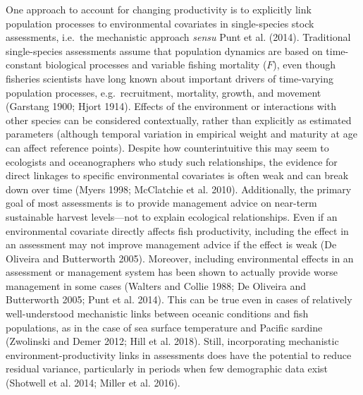 \documentclass[]{article}
\begin{document}
One approach to account for changing productivity is to explicitly link
population processes to environmental covariates in single-species stock
assessments, i.e.~the mechanistic approach \emph{sensu} Punt et al.
(2014). Traditional single-species assessments assume that population
dynamics are based on time-constant biological processes and variable
fishing mortality (\(F\)), even though fisheries scientists have long
known about important drivers of time-varying population processes,
e.g.~recruitment, mortality, growth, and movement (Garstang 1900; Hjort
1914). Effects of the environment or interactions with other species can
be considered contextually, rather than explicitly as estimated
parameters (although temporal variation in empirical weight and maturity
at age can affect reference points). Despite how counterintuitive this
may seem to ecologists and oceanographers who study such relationships,
the evidence for direct linkages to specific environmental covariates is
often weak and can break down over time (Myers 1998; McClatchie et al.
2010). Additionally, the primary goal of most assessments is to provide
management advice on near-term sustainable harvest levels---not to
explain ecological relationships. Even if an environmental covariate
directly affects fish productivity, including the effect in an
assessment may not improve management advice if the effect is weak (De
Oliveira and Butterworth 2005). Moreover, including environmental
effects in an assessment or management system has been shown to actually
provide worse management in some cases (Walters and Collie 1988; De
Oliveira and Butterworth 2005; Punt et al. 2014). This can be true even
in cases of relatively well-understood mechanistic links between oceanic
conditions and fish populations, as in the case of sea surface
temperature and Pacific sardine (Zwolinski and Demer 2012; Hill et al.
2018). Still, incorporating mechanistic environment-productivity links
in assessments does have the potential to reduce residual variance,
particularly in periods when few demographic data exist (Shotwell et al.
2014; Miller et al. 2016).
\end{document}

